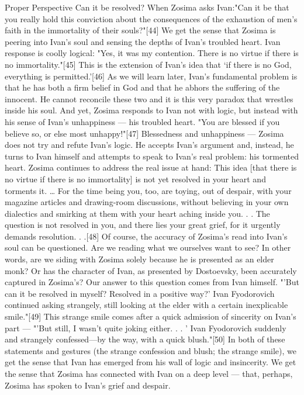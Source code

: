 Proper Perspective
Can it be resolved?
When Zosima asks Ivan:"Can it be that you really hold this conviction about the consequences of the exhaustion of men's faith in the immortality of their souls?"[44] We get the sense that Zosima is peering into Ivan's soul and sensing the depths of Ivan's troubled heart. Ivan response is coolly logical: "Yes, it was my contention. There is no virtue if there is no immortality."[45] This is the extension of Ivan’s idea that ‘if there is no God, everything is permitted.'[46] As we will learn later, Ivan's fundamental problem is that he has both a firm belief in God and that he abhors the suffering of the innocent. He cannot reconcile these two and it is this very paradox that wrestles inside his soul. And yet, Zosima responds to Ivan not with logic, but instead with his sense of Ivan's unhappiness — his troubled heart.
"You are blessed if you believe so, or else most unhappy!"[47] Blessedness and unhappiness — Zosima does not try and refute Ivan's logic. He accepts Ivan's argument and, instead, he turns to Ivan himself and attempts to speak to Ivan's real problem: his tormented heart. Zosima continues to address the real issue at hand: 
This idea [that there is no virtue if there is no immortality] is not yet resolved in your heart and torments it. … For the time being you, too, are toying, out of despair, with your magazine articles and drawing-room discussions, without believing in your own dialectics and smirking at them with your heart aching inside you. . . The question is not resolved in you, and there lies your great grief, for it urgently demands resolution. . .[48]
Of course, the accuracy of Zosima's read into Ivan's soul can be questioned. Are we reading what we ourselves want to see? In other words, are we siding with Zosima solely because he is presented as an elder monk? Or has the character of Ivan, as presented by Dostoevsky, been accurately captured in Zosima's? Our answer to this question comes from Ivan himself. "'But can it be resolved in myself? Resolved in a positive way?' Ivan Fyodorovich continued asking strangely, still looking at the elder with a certain inexplicable smile."[49] This strange smile comes after a quick admission of sincerity on Ivan's part — "'But still, I wasn't quite joking either. . . ' Ivan Fyodorovich suddenly and strangely confessed—by the way, with a quick blush."[50] In both of these statements and gestures (the strange confession and blush; the strange smile), we get the sense that Ivan has emerged from his wall of logic and insincerity. We get the sense that Zosima has connected with Ivan on a deep level — that, perhaps, Zosima has spoken to Ivan's grief and despair.
